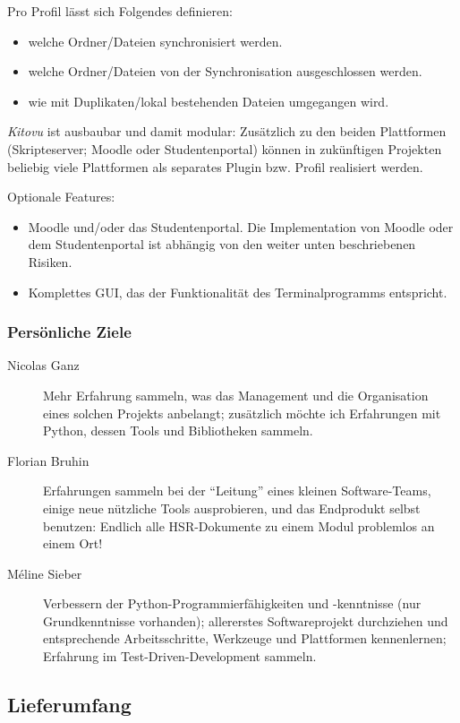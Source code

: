 \documentclass[a4paper]{article}
\begin{document}
Pro Profil lässt sich Folgendes definieren:

\begin{itemize}
  \item welche Ordner/Dateien synchronisiert werden.
  \item welche Ordner/Dateien von der Synchronisation ausgeschlossen werden.
  \item wie mit Duplikaten/lokal bestehenden Dateien umgegangen wird.
\end{itemize}

\emph{Kitovu} ist ausbaubar und damit modular: Zusätzlich zu den beiden Plattformen (Skripteserver; Moodle oder Studentenportal) können in zukünftigen Projekten beliebig viele Plattformen als separates Plugin bzw. Profil realisiert werden.

Optionale Features:

\begin{itemize}
  \item Moodle und/oder das Studentenportal. Die Implementation von Moodle oder dem Studentenportal ist abhängig von den weiter unten beschriebenen Risiken.
  \item Komplettes GUI, das der Funktionalität des Terminalprogramms entspricht.
\end{itemize}

\subsubsection{Persönliche Ziele}
\begin{description}
\item[Nicolas Ganz] 
  Mehr Erfahrung sammeln, was das Management und die Organisation eines solchen Projekts anbelangt; zusätzlich möchte ich Erfahrungen mit Python, dessen Tools und Bibliotheken sammeln.
\item[Florian Bruhin] Erfahrungen sammeln bei der ``Leitung'' eines kleinen
  Software-Teams, einige neue nützliche Tools ausprobieren, und das Endprodukt selbst benutzen: Endlich alle HSR-Dokumente zu einem Modul problemlos an einem Ort!
\item[Méline Sieber] Verbessern der Python-Programmierfähigkeiten und -kenntnisse (nur Grundkenntnisse vorhanden); allererstes Softwareprojekt durchziehen und entsprechende Arbeitsschritte, Werkzeuge und Plattformen kennenlernen; Erfahrung im Test-Driven-Development sammeln.
\end{description}

\subsection{Lieferumfang}
\end{document}
